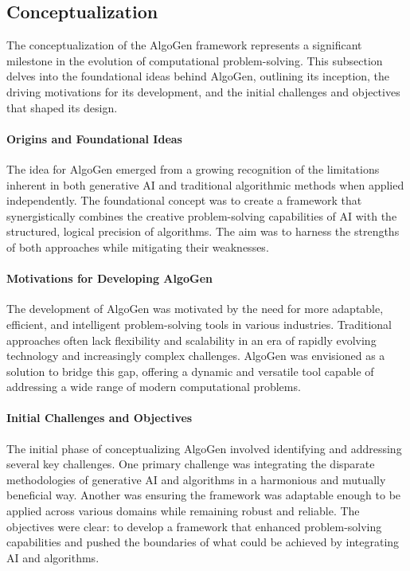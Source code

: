 \documentclass{article}
\begin{document}
\subsection{Conceptualization}

The conceptualization of the AlgoGen framework represents a significant milestone in the evolution of computational problem-solving. This subsection delves into the foundational ideas behind AlgoGen, outlining its inception, the driving motivations for its development, and the initial challenges and objectives that shaped its design.

\paragraph{Origins and Foundational Ideas}
The idea for AlgoGen emerged from a growing recognition of the limitations inherent in both generative AI and traditional algorithmic methods when applied independently. The foundational concept was to create a framework that synergistically combines the creative problem-solving capabilities of AI with the structured, logical precision of algorithms. The aim was to harness the strengths of both approaches while mitigating their weaknesses.

\paragraph{Motivations for Developing AlgoGen}
The development of AlgoGen was motivated by the need for more adaptable, efficient, and intelligent problem-solving tools in various industries. Traditional approaches often lack flexibility and scalability in an era of rapidly evolving technology and increasingly complex challenges. AlgoGen was envisioned as a solution to bridge this gap, offering a dynamic and versatile tool capable of addressing a wide range of modern computational problems.

\paragraph{Initial Challenges and Objectives}
The initial phase of conceptualizing AlgoGen involved identifying and addressing several key challenges. One primary challenge was integrating the disparate methodologies of generative AI and algorithms in a harmonious and mutually beneficial way. Another was ensuring the framework was adaptable enough to be applied across various domains while remaining robust and reliable. The objectives were clear: to develop a framework that enhanced problem-solving capabilities and pushed the boundaries of what could be achieved by integrating AI and algorithms.
\end{document}
